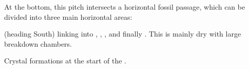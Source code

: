 At the bottom, this pitch intersects a horizontal fossil passage, which can be divided into three main horizontal areas:

\textbf{} (heading South) linking into ,
, ,  and
finally . This is mainly dry with large breakdown
chambers.

    \begin{marginfigure}
\checkoddpage \ifoddpage \forcerectofloat \else \forceversofloat \fi
\centering
\caption{Crystal formations at the start of the \protect{}. } \label{Minos crystals 1}
\end{marginfigure}


